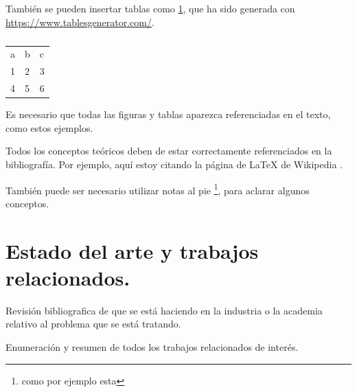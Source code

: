 También se pueden insertar tablas como \ref{tab:my-table}, que ha sido generada con \url{https://www.tablesgenerator.com/}.

\begin{table}[]
\begin{tabular}{lll}
a & b & c \\
1 & 2 & 3 \\
4 & 5 & 6
\end{tabular}
\caption{}
\label{tab:my-table}
\end{table}

Es necesario que todas las figuras y tablas aparezca referenciadas en el texto, como estos ejemplos.

Todos los conceptos teóricos deben de estar correctamente referenciados en la bibliografía. Por ejemplo, aquí estoy citando la página de \LaTeX{} de Wikipedia \cite{wiki:latex}.

También puede ser necesario utilizar notas al pie \footnote{como por ejemplo esta}, para aclarar algunos conceptos.


\section{Estado del arte y trabajos relacionados.}

Revisión bibliografica de que se está haciendo en la industria o la academia relativo al problema que se está tratando.

Enumeración y resumen de todos los trabajos relacionados de interés.

